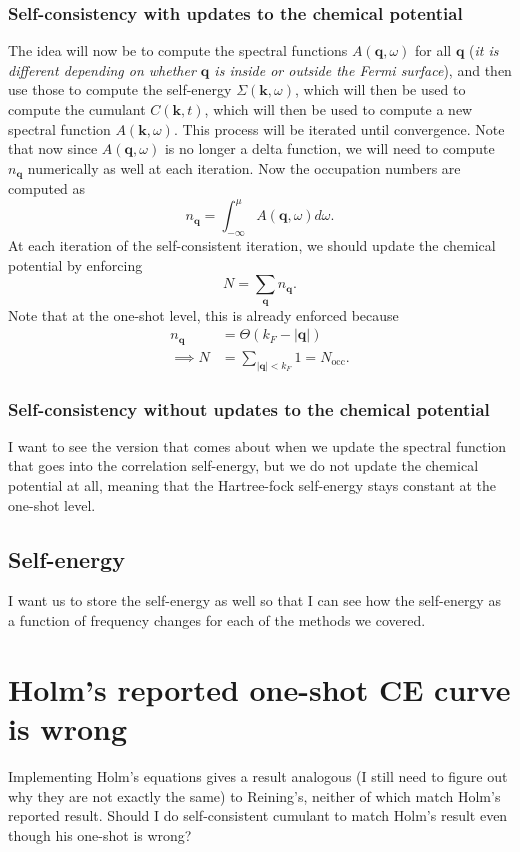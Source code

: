 \subsubsection{Self-consistency with updates to the chemical potential}
The idea will now be to compute the spectral functions $A(\mathbf{q}, \omega)$ for all $\mathbf{q}$ (\emph{it is different depending on whether $\mathbf{q}$ is inside or outside the Fermi surface}), and then use those to compute the self-energy $\Sigma(\bm{k}, \omega)$, which will then be used to compute the cumulant $C(\bm{k}, t)$, which will then be used to compute a new spectral function $A(\bm{k}, \omega)$. This process will be iterated until convergence. Note that now since $A(\mathbf{q}, \omega)$ is no longer a delta function, we will need to compute $n_{\mathbf{q}}$ numerically as well at each iteration. Now the occupation numbers are computed as 
\begin{equation}
    n_{\mathbf{q}}=\int_{-\infty}^\mu A(\mathbf{q}, \omega) d \omega.
\end{equation}
At each iteration of the self-consistent iteration, we should update the chemical potential by enforcing 
\begin{equation}
    N=\sum_{\mathbf{q}} n_{\mathbf{q}}.
\end{equation}
Note that at the one-shot level, this is already enforced because 
\begin{align}
    n_{\mathbf{q}} &= \Theta\left(k_F-|\mathbf{q}|\right) \\
\implies N &= \sum_{|\bm{q}|<k_F} 1 = N_\mathrm{occ}.
\end{align}
\subsubsection{Self-consistency without updates to the chemical potential}
I want to see the version that comes about when we update the spectral function that goes into the correlation self-energy, but we do not update the chemical potential at all, meaning that the Hartree-fock self-energy stays constant at the one-shot level. 
\subsection{Self-energy}
I want us to store the self-energy as well so that I can see how the self-energy as a function of frequency changes for each of the methods we covered. 
\section{Holm's reported one-shot CE curve is wrong}
Implementing Holm's equations gives a result analogous (I still need to figure out why they are not exactly the same) to Reining's, neither of which match Holm's reported result. Should I do self-consistent cumulant to match Holm's result even though his one-shot is wrong? 

